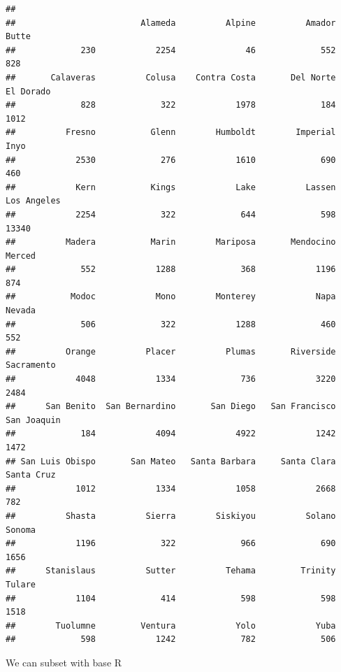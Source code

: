 \documentclass[
]{article}
\newenvironment{Shaded}{\begin{snugshade}}{\end{snugshade}}
\newcommand{\FunctionTok}[1]{\textcolor[rgb]{0.00,0.00,0.00}{#1}}
\newcommand{\NormalTok}[1]{#1}
\newcommand{\OtherTok}[1]{\textcolor[rgb]{0.56,0.35,0.01}{#1}}
\newcommand{\SpecialCharTok}[1]{\textcolor[rgb]{0.00,0.00,0.00}{#1}}
\newcommand{\StringTok}[1]{\textcolor[rgb]{0.31,0.60,0.02}{#1}}
\begin{document}
\begin{Shaded}
\end{Shaded}

\begin{verbatim}
## 
##                         Alameda          Alpine          Amador           Butte 
##             230            2254              46             552             828 
##       Calaveras          Colusa    Contra Costa       Del Norte       El Dorado 
##             828             322            1978             184            1012 
##          Fresno           Glenn        Humboldt        Imperial            Inyo 
##            2530             276            1610             690             460 
##            Kern           Kings            Lake          Lassen     Los Angeles 
##            2254             322             644             598           13340 
##          Madera           Marin        Mariposa       Mendocino          Merced 
##             552            1288             368            1196             874 
##           Modoc            Mono        Monterey            Napa          Nevada 
##             506             322            1288             460             552 
##          Orange          Placer          Plumas       Riverside      Sacramento 
##            4048            1334             736            3220            2484 
##      San Benito  San Bernardino       San Diego   San Francisco     San Joaquin 
##             184            4094            4922            1242            1472 
## San Luis Obispo       San Mateo   Santa Barbara     Santa Clara      Santa Cruz 
##            1012            1334            1058            2668             782 
##          Shasta          Sierra        Siskiyou          Solano          Sonoma 
##            1196             322             966             690            1656 
##      Stanislaus          Sutter          Tehama         Trinity          Tulare 
##            1104             414             598             598            1518 
##        Tuolumne         Ventura            Yolo            Yuba 
##             598            1242             782             506
\end{verbatim}

We can subset with base R

\begin{Shaded}
\end{Shaded}
\end{document}

